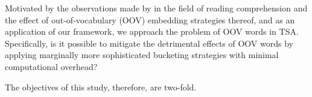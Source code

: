 \documentclass[../../fyp.tex]{subfiles}
\begin{document}



Motivated by the observations made by \citet{bhuwandhingra2017} in the field of reading comprehension and the effect of out-of-vocabulary (OOV) embedding strategies thereof, and as an application of our framework, we approach the problem of OOV words in TSA. Specifically, is it possible to mitigate the detrimental effects of OOV words by applying marginally more sophisticated bucketing strategies with minimal computational overhead?

The objectives of this study, therefore, are two-fold.
\end{document}

